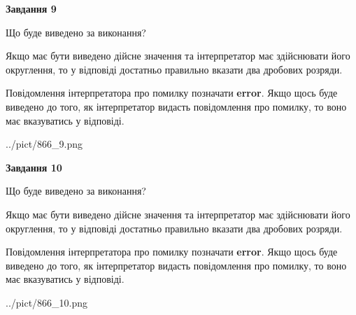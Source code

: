 \documentclass[12pt, ukrainian]{article}
\begin{document}
{\begin {Large}
{\begin {center}\textbf{Завдання 9}\end {center}}\par
Що буде виведено за виконання? \par

Якщо має бути виведено дійсне значення та інтерпретатор має здійснювати його округлення, 
то у відповіді достатньо правильно вказати два дробових розряди.

Повідомлення інтерпретатора про помилку позначати \textbf{error}.
Якщо щось буде виведено до того, як інтерпретатор видасть повідомлення про помилку, 
то воно має вказуватись у відповіді. \par

\begin{center}
	{../pict/866_9.png}
\end{center}
\newpage

{\begin {center}\textbf{Завдання 10}\end {center}}\par
Що буде виведено за виконання? \par

Якщо має бути виведено дійсне значення та інтерпретатор має здійснювати його округлення, 
то у відповіді достатньо правильно вказати два дробових розряди.

Повідомлення інтерпретатора про помилку позначати \textbf{error}.
Якщо щось буде виведено до того, як інтерпретатор видасть повідомлення про помилку, 
то воно має вказуватись у відповіді. \par

\begin{center}
	{../pict/866_10.png}
\end{center}
\newpage

\end {Large}}
\end{document}
